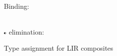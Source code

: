 \documentclass[index.tex]{subfiles}
\begin{document}
\begin{figure}
\begin{mathpar}
  \end{mathpar} \\
  Binding:
  \begin{mathpar}
  \end{mathpar} \\
  $\CII$ elimination:
  \begin{mathpar}
  \end{mathpar}
  \caption{Type assignment for LIR composites}
  \label{lir-ta-comp}
\end{figure}
   
\end{document}

